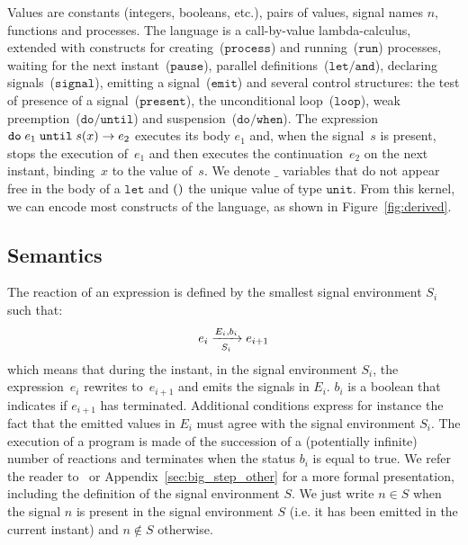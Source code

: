 \documentclass[9pt,preprint]{sigplanconf}
\begin{document}
Values are constants (integers, booleans, etc.), pairs of values, signal names $n$, functions and processes. The language is a call-by-value lambda-calculus, extended with constructs for creating~($\mathtt{process}$) and running~($\mathtt{run}$) processes, waiting for the next instant~($\mathtt{pause}$), parallel definitions~($\mathtt{let/and}$), declaring signals~($\mathtt{signal}$), emitting a signal~($\mathtt{emit}$) and several control structures: the test of presence of a signal~($\mathtt{present}$), the unconditional loop~($\mathtt{loop}$), weak preemption~($\mathtt{do/until}$) and suspension~($\mathtt{do/when}$).  The expression $\euntil{e_1}{s}{x}{e_2}$ executes its body $e_1$ and, when the signal~$s$ is present, stops the execution of~$e_1$ and then executes the continuation~$e_2$ on the next instant, binding~$x$ to the value of~$s$. We denote $\_$ variables that do not appear free in the body of a $\mathtt{let}$ and $\evoid{}$ the unique value of type $\mathtt{unit}$. From this kernel, we can encode most constructs of the language, as shown in Figure~\ref{fig:derived}.

\subsection{Semantics}

The reaction of an expression is defined by the smallest signal environment $S_i$ such that:
\[ \bigstep{N}{e_i}{e_{i+1}}{E_i}{b_i}{S_i} \]
which means that during the instant, in the signal environment $S_i$, the expression~$e_i$ rewrites to~$e_{i+1}$ and emits the signals in $E_i$. $b_i$ is a boolean that indicates if $e_{i+1}$ has terminated. Additional conditions express for instance the fact that the emitted values in $E_i$ must agree with the signal environment $S_i$. The execution of a program is made of the succession of a (potentially infinite) number of reactions and terminates when the status $b_i$ is equal to true.
%
 We refer the reader to~\cite{Mandel:2005} or Appendix~\ref{sec:big_step_other} for a more formal presentation, including the definition of the signal environment $S$. We just write $n \in S$ when the signal $n$ is present in the signal environment $S$ (i.e. it has been emitted in the current instant) and $n \not\in S$ otherwise.
\end{document}
